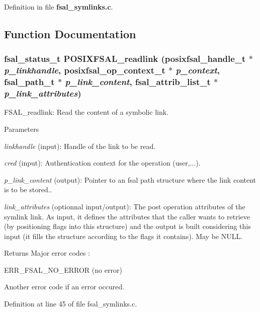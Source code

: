 Definition in file {\bf fsal\_\-symlinks.c}.

\subsection{Function Documentation}
\subsubsection[{POSIXFSAL\_\-readlink}]{\setlength{\rightskip}{0pt plus 5cm}fsal\_\-status\_\-t POSIXFSAL\_\-readlink (posixfsal\_\-handle\_\-t $\ast$ {\em p\_\-linkhandle}, \/  posixfsal\_\-op\_\-context\_\-t $\ast$ {\em p\_\-context}, \/  fsal\_\-path\_\-t $\ast$ {\em p\_\-link\_\-content}, \/  fsal\_\-attrib\_\-list\_\-t $\ast$ {\em p\_\-link\_\-attributes})}\label{fsal__symlinks_8c_a582efe4a14eee6f77d29e8861eac72c0}
FSAL\_\-readlink: Read the content of a symbolic link.


\begin{DoxyParams}{Parameters}
\item[{\em linkhandle}](input): Handle of the link to be read. \item[{\em cred}](input): Authentication context for the operation (user,...). \item[{\em p\_\-link\_\-content}](output): Pointer to an fsal path structure where the link content is to be stored.. \item[{\em link\_\-attributes}](optionnal input/output): The post operation attributes of the symlink link. As input, it defines the attributes that the caller wants to retrieve (by positioning flags into this structure) and the output is built considering this input (it fills the structure according to the flags it contains). May be NULL.\end{DoxyParams}
\begin{DoxyReturn}{Returns}
Major error codes :
\begin{DoxyItemize}
\item ERR\_\-FSAL\_\-NO\_\-ERROR (no error)
\item Another error code if an error occured. 
\end{DoxyItemize}
\end{DoxyReturn}


Definition at line 45 of file fsal\_\-symlinks.c.

